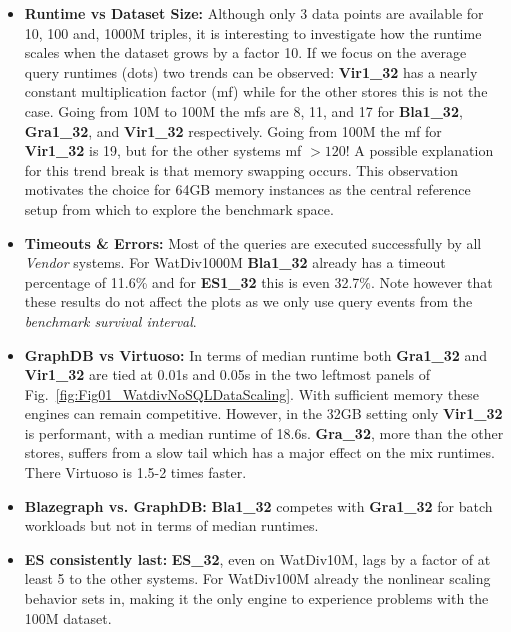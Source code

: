 \begin{itemize}
	\item \textbf{Runtime vs Dataset Size:} Although only 3 data points are available for 10, 100 and, 1000M triples, it is interesting to investigate how the runtime scales when the dataset grows by a factor 10. If we focus on the average query runtimes (dots) two trends can be observed: \textbf{Vir1\_32} has a nearly constant multiplication factor (mf) while for the other stores this is not the case. Going from 10M to 100M the mfs are 8, 11, and 17 for \textbf{Bla1\_32}, \textbf{Gra1\_32}, and \textbf{Vir1\_32} respectively. Going from 100M the mf for \textbf{Vir1\_32} is 19, but for the other systems mf $> 120$! A possible explanation for this trend break is that memory swapping occurs. This observation motivates the choice for 64GB memory instances as the central reference setup from which to explore the benchmark space.
\item \textbf{Timeouts \& Errors:} Most of the queries are executed successfully by all \emph{Vendor} systems. For WatDiv1000M \textbf{Bla1\_32} already has a timeout percentage of 11.6\% and for \textbf{ES1\_32} this is even 32.7\%. Note however that these results do not affect the plots as we only use query events from the \emph{benchmark survival interval}. 
\item \textbf{GraphDB vs Virtuoso:} In terms of median runtime both \textbf{Gra1\_32} and \textbf{Vir1\_32} are tied at 0.01s and 0.05s in the two leftmost panels of Fig.~\ref{fig:Fig01_WatdivNoSQLDataScaling}. With sufficient memory these engines can remain competitive. However, in the 32GB setting only \textbf{Vir1\_32} is performant, with a median runtime of 18.6s. \textbf{Gra\_32}, more than the other stores, suffers from a slow tail which has a major effect on the mix runtimes. There Virtuoso is 1.5-2 times faster.

\item \textbf{Blazegraph vs. GraphDB:} \textbf{Bla1\_32} competes with \textbf{Gra1\_32} for batch workloads but not in terms of median runtimes.

\item \textbf{ES consistently last:} \textbf{ES\_32}, even on WatDiv10M, lags by a factor of at least 5 to the other systems. For WatDiv100M already the nonlinear scaling behavior sets in, making it the only engine to experience problems with the 100M dataset. 
\end{itemize}
%
